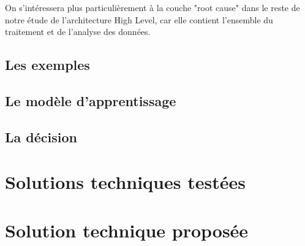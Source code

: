 On s'intéressera plus particulièrement à la couche "root cause" dans le reste de notre étude de l'architecture High Level, car elle contient l'ensemble du traitement et de l'analyse des données.

\subsection{Les exemples}
\label{Automatisation du processus d'investigation: Achitecture High Level du système proposé: Les exemples}

\subsection{Le modèle d'apprentissage}
\label{Automatisation du processus d'investigation: Achitecture High Level du système proposé: Le modèle d'apprentissage}

\subsection{La décision}
\label{Automatisation du processus d'investigation: Achitecture High Level du système proposé: La décision}



\section{Solutions techniques testées}
\label{Automatisation du processus d'investigation: Solutions techniques testées}




\section{Solution technique proposée}
\label{Automatisation du processus d'investigation: Solution technique proposée}

